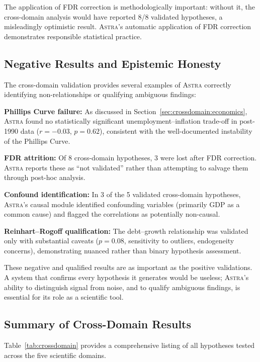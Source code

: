\documentclass[usenatbib]{rasti}
\newcommand{\astra}{\textsc{Astra}\xspace}
\begin{document}
The application of FDR correction is methodologically important: without it, the cross-domain analysis would have reported 8/8 validated hypotheses, a misleadingly optimistic result. \astra's automatic application of FDR correction demonstrates responsible statistical practice.

\subsection{Negative Results and Epistemic Honesty}
\label{sec:crossdomain:negatives}

The cross-domain validation provides several examples of \astra correctly identifying non-relationships or qualifying ambiguous findings:

\textbf{Phillips Curve failure:} As discussed in Section~\ref{sec:crossdomain:economics}, \astra found no statistically significant unemployment--inflation trade-off in post-1990 data ($r = -0.03$, $p = 0.62$), consistent with the well-documented instability of the Phillips Curve.

\textbf{FDR attrition:} Of 8 cross-domain hypotheses, 3 were lost after FDR correction. \astra reports these as ``not validated'' rather than attempting to salvage them through post-hoc analysis.

\textbf{Confound identification:} In 3 of the 5 validated cross-domain hypotheses, \astra's causal module identified confounding variables (primarily GDP as a common cause) and flagged the correlations as potentially non-causal.

\textbf{Reinhart--Rogoff qualification:} The debt--growth relationship was validated only with substantial caveats ($p = 0.08$, sensitivity to outliers, endogeneity concerns), demonstrating nuanced rather than binary hypothesis assessment.

These negative and qualified results are as important as the positive validations. A system that confirms every hypothesis it generates would be useless; \astra's ability to distinguish signal from noise, and to qualify ambiguous findings, is essential for its role as a scientific tool.

\subsection{Summary of Cross-Domain Results}

Table~\ref{tab:crossdomain} provides a comprehensive listing of all hypotheses tested across the five scientific domains.
\end{document}
